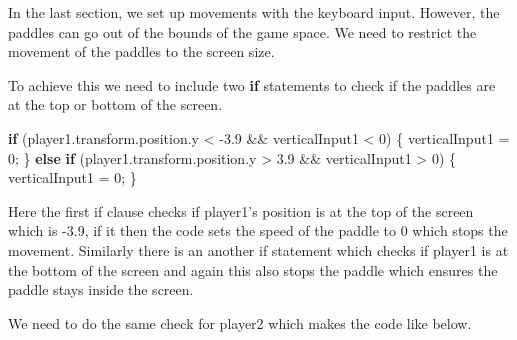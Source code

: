 \documentclass[
]{book}
\newenvironment{Shaded}{\begin{snugshade}}{\end{snugshade}}
\newcommand{\DecValTok}[1]{\textcolor[rgb]{0.00,0.00,0.81}{#1}}
\newcommand{\FloatTok}[1]{\textcolor[rgb]{0.00,0.00,0.81}{#1}}
\newcommand{\FunctionTok}[1]{\textcolor[rgb]{0.00,0.00,0.00}{#1}}
\newcommand{\KeywordTok}[1]{\textcolor[rgb]{0.13,0.29,0.53}{\textbf{#1}}}
\newcommand{\NormalTok}[1]{#1}
\begin{document}
In the last section, we set up movements with the keyboard input. However, the paddles can go out of the bounds of the game space. We need to restrict the movement of the paddles to the screen size.

To achieve this we need to include two \textbf{if} statements to check if the paddles are at the top or bottom of the screen.

\begin{Shaded}
\begin{Highlighting}[]
\KeywordTok{if}\NormalTok{ (player1.}\FunctionTok{transform}\NormalTok{.}\FunctionTok{position}\NormalTok{.}\FunctionTok{y}\NormalTok{ < }\FloatTok{-3.9}\NormalTok{ && verticalInput1 < }\DecValTok{0}\NormalTok{)}
\NormalTok{\{}
\NormalTok{  verticalInput1 = }\DecValTok{0}\NormalTok{;}
\NormalTok{\}}
\KeywordTok{else} \KeywordTok{if}\NormalTok{ (player1.}\FunctionTok{transform}\NormalTok{.}\FunctionTok{position}\NormalTok{.}\FunctionTok{y}\NormalTok{ > }\FloatTok{3.9}\NormalTok{ && verticalInput1 > }\DecValTok{0}\NormalTok{)}
\NormalTok{\{}
\NormalTok{  verticalInput1 = }\DecValTok{0}\NormalTok{;}
\NormalTok{\}}
\end{Highlighting}
\end{Shaded}

Here the first if clause checks if player1's position is at the top of the screen which is -3.9, if it then the code sets the speed of the paddle to 0 which stops the movement. Similarly there is an another if statement which checks if player1 is at the bottom of the screen and again this also stops the paddle which ensures the paddle stays inside the screen.

We need to do the same check for player2 which makes the code like below.
\end{document}

